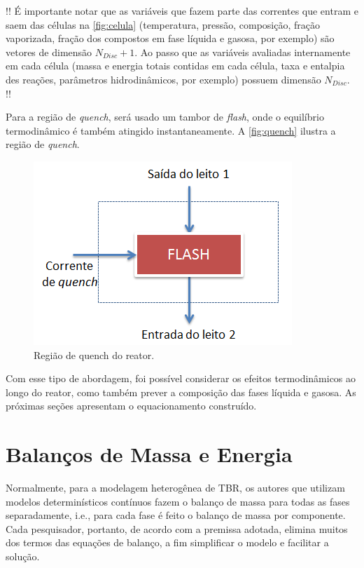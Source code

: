 
!! É importante notar que as variáveis que fazem parte das correntes que
entram e saem das células na \autoref{fig:celula} (temperatura,
pressão, composição, fração vaporizada, fração dos compostos em fase líquida e
gasosa, por exemplo) são vetores de dimensão $N_{Disc}+1$.
Ao passo que as variáveis avaliadas internamente em cada célula (massa e energia
totais contidas em cada célula, taxa e entalpia des reações, parâmetros
hidrodinâmicos, por exemplo) possuem dimensão $N_{Disc}$. !!

Para a região de \emph{quench}, será usado um tambor de \emph{flash}, onde o
equilíbrio termodinâmico é também atingido instantaneamente. A
\autoref{fig:quench} ilustra a região de \emph{quench}.

 \begin{figure}[htb]
 \centering \includegraphics[scale=0.75]{images/Chap3/quench.png}
 \caption{Região de quench do reator.}
 \label{fig:quench}
 \end{figure}

Com esse tipo de abordagem, foi possível considerar os efeitos termodinâmicos
ao longo do reator, como também prever a composição das fases líquida e
gasosa. As próximas seções apresentam o equacionamento construído.

\section{Balanços de Massa e Energia} \label{sec:balancomassaenergia}

Normalmente, para a modelagem heterogênea de TBR, os autores que
utilizam modelos determinísticos contínuos fazem o balanço de massa para todas as
fases separadamente, i.e., para cada fase é feito o balanço de massa por
componente. %
Cada pesquisador, portanto, de acordo com a premissa adotada, elimina muitos dos
termos das equações de balanço, a fim simplificar o modelo e facilitar a
solução. 

